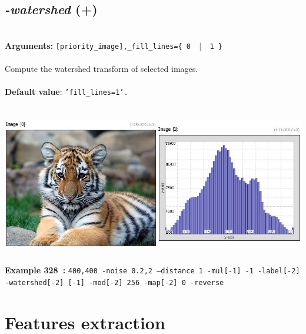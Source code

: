 \documentclass[a4paper,11pt,twoside]{book}
\begin{document}
\subsection{\emph{-watershed} (+)}\vspace*{-0.5em}
~\\\textbf{Arguments: } 
{\small \texttt{[priority\_image],\_fill\_lines=\{ 0 ~$|$~ 1 \}}}\\~\\
Compute the watershed transform of selected images.
~\\~\\\textbf{Default value}: {\small \texttt{'fill\_lines=1'.}}
\begin{center}\includegraphics[keepaspectratio=true,height=7cm,width=\textwidth]{img/gmic_def328.jpg}\\
{\footnotesize \textbf{Example 328~:} \texttt{400,400 -noise 0.2,2 --distance 1 -mul[-1] -1 -label[-2] -watershed[-2] [-1] -mod[-2] 256 -map[-2] 0 -reverse}}
\end{center}
\section{Features extraction}
\end{document}
